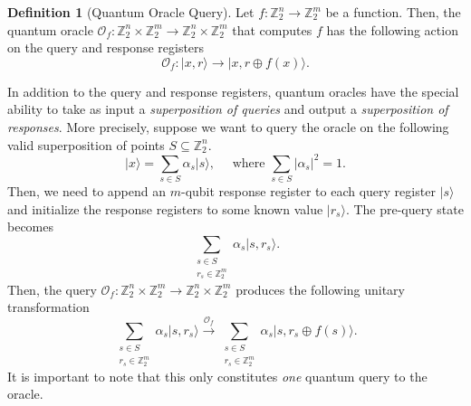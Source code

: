 \documentclass[12pt,twoside]{reedthesis}
\theoremstyle{definition}
\newtheorem{definition}[theorem]{Definition}
\newlength{\arrow}
\newcommand{\Z}{\mathbb{Z}}
\newcommand{\ket}[1]{\ensuremath{\lvert #1\rangle}\xspace}
\begin{document}
\begin{definition}[Quantum Oracle Query] Let $f: \Z_2^n \rightarrow \Z_2^m$ be a function. Then, the quantum oracle $\mathcal{O}_f : \Z_2^n \times \Z_2^m \rightarrow \Z_2^n \times \Z_2^m$ that computes $f$ has the following action on the query and response registers 
\begin{equation*}
\mathcal{O}_f : \ket{x, r} \rightarrow \ket{x, r \oplus f(x)}.
\end{equation*}
\end{definition}
In addition to the query and response registers, quantum oracles have the special ability to take as input a \textit{superposition of queries} and output a \textit{superposition of responses}. More precisely, suppose we want to query the oracle on the following valid superposition of points $S \subseteq \Z_2^n$.
\begin{equation*}
\ket{x} = \sum_{s \in S} \alpha_s \ket{s}, \quad \text{ where } \sum_{s \in S} \lvert \alpha_s\rvert^2 = 1.
\end{equation*}
Then, we need to append an $m$-qubit response register to each query register $\ket{s}$  and initialize the response registers to some known value $\ket{r_s}$. The pre-query state becomes
\begin{equation*}
\sum_{\substack{s \in S \\ r_s \in \Z_2^m}} \alpha_s \ket{s, r_s} .
\end{equation*}
Then, the query $\mathcal{O}_f:  \Z_2^n \times \Z_2^m \rightarrow \Z_2^n \times \Z_2^m$ produces the following unitary transformation
\begin{equation*}
\sum_{\substack{s \in S \\ r_s \in \Z_2^m}} \alpha_s \ket{s, r_s}  \xrightarrow{\mathcal{O}_f} \sum_{\substack{s \in S \\ r_s \in \Z_2^m}} \alpha_s \ket{s, r_s \oplus f(s)}.
\end{equation*}
It is important to note that this only constitutes \textit{one} quantum query to the oracle.
\end{document}

